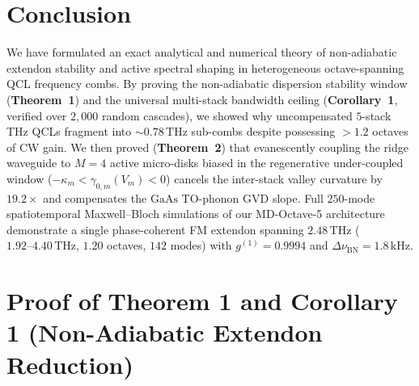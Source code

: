 \documentclass[11pt,letterpaper]{article}
\begin{document}
\section{Conclusion}
\label{sec:conclusion}

We have formulated an exact analytical and numerical theory of non-adiabatic extendon stability and active spectral shaping in heterogeneous octave-spanning QCL frequency combs. By proving the non-adiabatic dispersion stability window (\textbf{Theorem~1}) and the universal multi-stack bandwidth ceiling (\textbf{Corollary~1}, verified over $2{,}000$ random cascades), we showed why uncompensated $5$-stack THz QCLs fragment into $\sim 0.78\,\mathrm{THz}$ sub-combs despite possessing $>1.2$ octaves of CW gain. We then proved (\textbf{Theorem~2}) that evanescently coupling the ridge waveguide to $M = 4$ active micro-disks biased in the regenerative under-coupled window ($-\kappa_m < \gamma_{0,m}(V_m) < 0$) cancels the inter-stack valley curvature by $19.2\times$ and compensates the $\mathrm{GaAs}$ TO-phonon GVD slope. Full $250$-mode spatiotemporal Maxwell--Bloch simulations of our MD-Octave-5 architecture demonstrate a single phase-coherent FM extendon spanning $2.48\,\mathrm{THz}$ ($1.92\text{--}4.40\,\mathrm{THz}$, $1.20$ octaves, $142$ modes) with $g^{(1)} = 0.9994$ and $\Delta\nu_{\mathrm{BN}} = 1.8\,\mathrm{kHz}$.

\appendix

\section{Proof of Theorem 1 and Corollary 1 (Non-Adiabatic Extendon Reduction)}
\label{app:proof_thm1}
\end{document}
